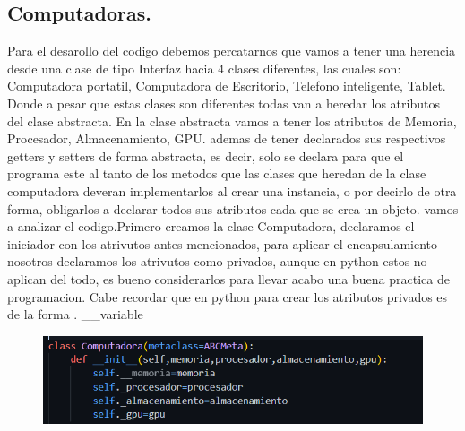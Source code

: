\documentclass[12pt]{article}
\begin{document}
\subsection{Computadoras.}
Para el desarollo del codigo debemos percatarnos que vamos a tener una herencia desde una clase de tipo Interfaz hacia 4 clases diferentes, las cuales son: Computadora portatil, Computadora de Escritorio, Telefono inteligente, Tablet. Donde a pesar que estas clases son diferentes todas van a heredar los atributos del clase abstracta. En la clase abstracta vamos a tener los atributos de Memoria, Procesador, Almacenamiento, GPU. ademas de tener declarados sus respectivos getters y setters de forma abstracta, es decir, solo se declara para que el programa este al tanto de los metodos que las clases que heredan de la clase computadora deveran implementarlos al crear una instancia, o por decirlo de otra forma, obligarlos a declarar todos sus atributos cada que se crea un objeto. vamos a analizar el codigo.Primero creamos la clase Computadora, declaramos el iniciador con los atrivutos antes mencionados, para aplicar el encapsulamiento nosotros declaramos los atrivutos como privados, aunque en python estos no aplican del todo, es bueno considerarlos para llevar acabo una buena practica de programacion. Cabe recordar que en python para crear los atributos privados es de la forma .
\_\_variable
\begin{figure}[H]
		\begin{center}
 			\includegraphics[width = .8\textwidth]{01.png}
 			
		\end{center} 
\end{figure}
\end{document}
